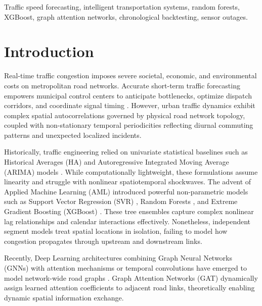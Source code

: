 \documentclass[conference]{IEEEtran}
\begin{document}
\begin{IEEEkeywords}
Traffic speed forecasting, intelligent transportation systems, random forests, XGBoost, graph attention networks, chronological backtesting, sensor outages.
\end{IEEEkeywords}

\section{Introduction}
Real-time traffic congestion imposes severe societal, economic, and environmental costs on metropolitan road networks. Accurate short-term traffic forecasting empowers municipal control centers to anticipate bottlenecks, optimize dispatch corridors, and coordinate signal timing \cite{vlahogianni2014short}. However, urban traffic dynamics exhibit complex spatial autocorrelations governed by physical road network topology, coupled with non-stationary temporal periodicities reflecting diurnal commuting patterns and unexpected localized incidents.

Historically, traffic engineering relied on univariate statistical baselines such as Historical Averages (HA) and Autoregressive Integrated Moving Average (ARIMA) models \cite{williams2003arima}. While computationally lightweight, these formulations assume linearity and struggle with nonlinear spatiotemporal shockwaves. The advent of Applied Machine Learning (AML) introduced powerful non-parametric models such as Support Vector Regression (SVR) \cite{castro2009svr}, Random Forests \cite{breiman2001random}, and Extreme Gradient Boosting (XGBoost) \cite{chen2016xgboost}. These tree ensembles capture complex nonlinear lag relationships and calendar interactions effectively. Nonetheless, independent segment models treat spatial locations in isolation, failing to model how congestion propagates through upstream and downstream links.

Recently, Deep Learning architectures combining Graph Neural Networks (GNNs) with attention mechanisms or temporal convolutions have emerged to model network-wide road graphs \cite{li2018dcrnn, velickovic2018gat, yu2018stgcn}. Graph Attention Networks (GAT) dynamically assign learned attention coefficients to adjacent road links, theoretically enabling dynamic spatial information exchange.
\end{document}
